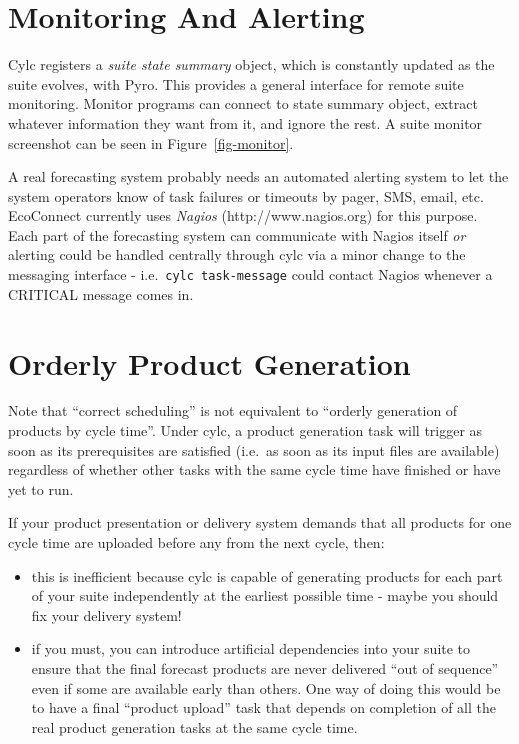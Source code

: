 \documentclass[11pt,a4paper]{article}
\begin{document}
\section{Monitoring And Alerting}
\label{SuiteMonitor}

Cylc registers a {\em suite state summary} object, which is constantly
updated as the suite evolves, with Pyro. This provides a
general interface for remote suite monitoring. Monitor programs can
connect to state summary object, extract whatever information they want
from it, and ignore the rest. A suite monitor screenshot can be seen in
Figure~\ref{fig-monitor}.

A real forecasting system probably needs an automated alerting system
to let the system operators know of task failures or timeouts by pager,
SMS, email, etc.  EcoConnect currently uses {\em Nagios}
(http://www.nagios.org) for this purpose. Each part of the forecasting
system can communicate with Nagios itself {\em or} alerting could be
handled centrally through cylc via a minor change to the messaging
interface - i.e.\ \lstinline=cylc task-message= could contact Nagios
whenever a CRITICAL message comes in.

\section{Orderly Product Generation}
\label{OrderlyProductGeneration}

Note that ``correct scheduling'' is not equivalent to ``orderly
generation of products by cycle time''.  Under cylc, a product
generation task will trigger as soon as its prerequisites are satisfied 
(i.e.\ as soon as its input files are available) regardless of
whether other tasks with the same cycle time have finished or have yet
to run. 

If your product presentation or delivery system demands that all
products for one cycle time are uploaded before any from the next
cycle, then:

\begin{itemize}
    \item this is inefficient because cylc is capable of generating products 
        for each part of your suite independently at the earliest
        possible time - maybe you should fix your delivery system!
    \item if you must, you can introduce artificial dependencies into
        your suite to ensure that the final forecast products are never
        delivered ``out of sequence'' even if some are available early
        than others.  One way of doing this would be to have a final
        ``product upload'' task that depends on completion of all the
        real product generation tasks at the same cycle time.
\end{itemize}
\end{document}
